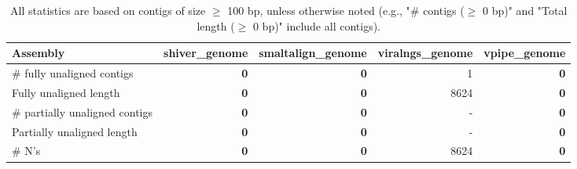 \documentclass[12pt,a4paper]{article}
\begin{document}
\begin{table}[ht]
\begin{center}
\caption{All statistics are based on contigs of size $\geq$ 100 bp, unless otherwise noted (e.g., "\# contigs ($\geq$ 0 bp)" and "Total length ($\geq$ 0 bp)" include all contigs).}
\begin{tabular}{|l*{4}{|r}|}
\hline
Assembly & shiver\_genome & smaltalign\_genome & viralngs\_genome & vpipe\_genome \\ \hline
\# fully unaligned contigs & {\bf 0} & {\bf 0} & 1 & {\bf 0} \\ \hline
Fully unaligned length & {\bf 0} & {\bf 0} & 8624 & {\bf 0} \\ \hline
\# partially unaligned contigs & {\bf 0} & {\bf 0} & - & {\bf 0} \\ \hline
Partially unaligned length & {\bf 0} & {\bf 0} & - & {\bf 0} \\ \hline
\# N's & {\bf 0} & {\bf 0} & 8624 & {\bf 0} \\ \hline
\end{tabular}
\end{center}
\end{table}
\end{document}
